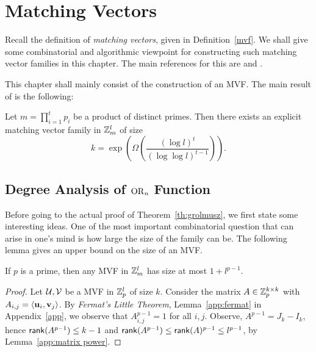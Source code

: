 \chapter{Matching Vectors}
\label{ch:mvf}

Recall the definition of \emph{matching vectors}, given in Definition~\ref{mvf}. We shall give some combinatorial and algorithmic viewpoint for constructing such matching vector families in this chapter. The main references for this are \cite{bbr1992} and \cite{Grolmusz2000}.

This chapter shall mainly consist of the construction of an MVF. The main result of \cite{Grolmusz2000} is the following:

\begin{blackbox}
     \begin{theorem}[Grolmusz]\label{th:grolmusz}
    Let
    $m = \prod_{i=1}^t p_i$
    be a product of distinct primes. Then there exists an explicit matching vector family in $\mathbb{Z}_m^l$ of size
    \[
    k = \exp\left(
        \Omega\left(
            \frac{(\log l)^t}{(\log\log l)^{t-1}}
        \right)
    \right).
    \]
\end{theorem}
\end{blackbox}

\section{Degree Analysis of $\operatorname{OR}_n$ Function}


Before going to the actual proof of Theorem~\ref{th:grolmusz}, we first state some interesting ideas. One of the most important combinatorial question that can arise in one's mind is how large the size of the family can be. The following lemma gives an upper bound on the size of an MVF.

\begin{greybox}
    \begin{lemma}
        If $p$ is a prime, then any MVF in $\mathbb{Z}_m^l$ has size at most $1 + l^{p-1}$. 
    \end{lemma}
\end{greybox}
\begin{proof}
    Let $\mathcal{U}, \mathcal{V}$ be a MVF in $\mathbb{Z}_p^l$ of size $k$. Consider the matrix $A\in\mathbb{Z}_p^{k\times k}$ with $A_{i,j} = \langle \mathbf{u}_i, \mathbf{v}_j \rangle$. By \emph{Fermat's Little Theorem}, Lemma~\ref{app:fermat} in Appendix~\ref{app}, we observe that $A_{i,j}^{p-1} = 1$ for all $i,j$. Observe, $A^{p-1} = J_k - I_k$, hence $\mathsf{rank}(A^{p-1})\leq k-1$ and $\mathsf{rank}(A^{p-1}) \leq \mathsf{rank}(A)^{p-1} \leq l^{p-1}$, by Lemma~\ref{app:matrix power}. 
\end{proof}


